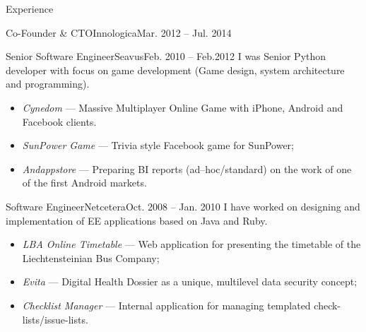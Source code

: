 \documentclass[]{mcdowellcv}
\begin{document}
\begin{cvsection}{Experience}
\begin{cvsubsection}{Co-Founder \& CTO}{Innologica}{Mar. 2012 -- Jul. 2014}
        \end{cvsubsection}
        \begin{cvsubsection}{Senior Software Engineer}{Seavus}{Feb. 2010 -- Feb.2012}
            I was Senior Python developer with focus on game development (Game design, system architecture and programming).
            \begin{itemize}
                \item \textit{Cynedom} --- Massive Multiplayer Online Game with iPhone, Android and Facebook clients.
                \item \textit{SunPower Game}  --- Trivia style Facebook game for SunPower;
                \item \textit{Andappstore} --- Preparing BI reports (ad--hoc/standard) on the work of one of the first Android markets.
            \end{itemize}
        \end{cvsubsection}
        \begin{cvsubsection}{Software Engineer}{Netcetera}{Oct. 2008 -- Jan. 2010}
            I have worked on designing and implementation of EE applications based on Java and Ruby.
            \begin{itemize}
                \item \textit{LBA Online Timetable} --- Web application for presenting the timetable of the Liechtensteinian Bus Company;
                \item \textit{Evita} --- Digital Health Dossier as a unique, multilevel data security concept;
                \item \textit{Checklist Manager} --- Internal application for managing templated check-lists/issue-lists.

\end{itemize}
\end{cvsubsection}
\end{cvsection}
\end{document}
